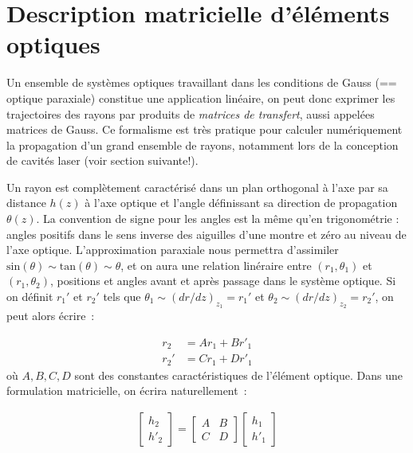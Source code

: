 \documentclass[a4paper]{book}
\begin{document}
\section{Description matricielle d'éléments optiques}

Un ensemble de systèmes optiques travaillant dans les conditions de Gauss (== optique paraxiale) constitue une application linéaire, on peut donc exprimer les trajectoires des rayons par produits de \textit{matrices de transfert}, aussi appelées matrices de Gauss. Ce formalisme est  très pratique pour calculer numériquement la propagation d'un grand ensemble de rayons, notamment lors de la conception de cavités laser (voir section suivante!).

Un rayon est complètement caractérisé dans un plan orthogonal à l'axe par sa distance $h(z)$ à l'axe optique et l'angle définissant sa direction de propagation $\theta(z)$. La convention de signe pour les angles est la même qu'en trigonométrie : angles positifs dans le sens inverse des aiguilles d'une montre et zéro au niveau de l'axe optique. 
L'approximation paraxiale nous permettra d'assimiler $\mathrm{sin}(\theta)\sim\mathrm{tan}(\theta)\sim\theta$, et on aura une relation linéraire entre $\left(r_1, \theta_1\right)$ et $\left(r_1, \theta_2\right)$, positions et angles avant et après passage dans le système optique. Si on définit $r_1'$ et $r_2'$ tels que $\theta_1 \sim (dr/dz)_z_1 = r_1'$ et $\theta_2 \sim (dr/dz)_z_2 = r_2'$, on peut alors écrire~: 

\begin{align} 
r_2 &=  Ar_1 + Br'_1 \\ 
r_2' &=  Cr_1 + Dr'_1
\end{align}
où $A, B, C, D$ sont des constantes caractéristiques de l'élément optique. Dans une formulation matricielle, on écrira naturellement~:

\begin{gather}
 \begin{bmatrix} h_2 \\ h'_2 \end{bmatrix}
 =
  \begin{bmatrix}
   A & B \\
   C & D 
   \end{bmatrix}
   \begin{bmatrix} h_1 \\ h'_1 \end{bmatrix}
\end{gather}
\end{document}
